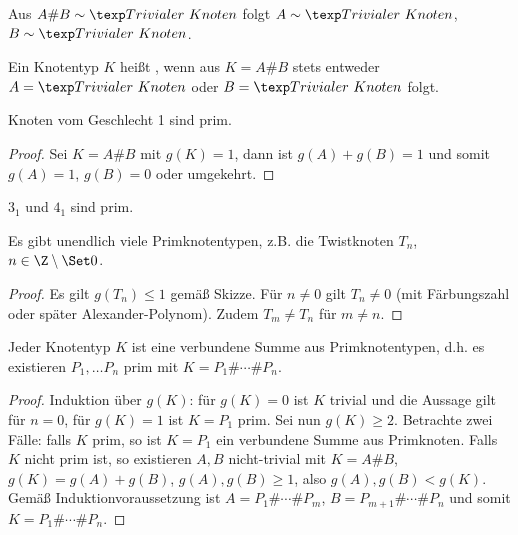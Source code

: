 \begin{kor}
    Aus $A \# B \sim \KnotTriv$ folgt $A \sim \KnotTriv$, $B \sim \KnotTriv$.
\end{kor}

\begin{df}
    Ein Knotentyp $K$ heißt , wenn aus $K = A \# B$ stets entweder $A = \KnotTriv$ oder $B = \KnotTriv$ folgt.
\end{df}

\begin{prop}
    Knoten vom Geschlecht 1 sind prim.
    \begin{proof}
        Sei $K = A \# B$ mit $g(K) = 1$, dann ist $g(A) + g(B) = 1$ und somit $g(A) = 1$, $g(B) = 0$ oder umgekehrt.
    \end{proof}
\end{prop}

\begin{ex}
    $3_1$ und $4_1$ sind prim.
\end{ex}

\begin{prop}
    Es gibt unendlich viele Primknotentypen, z.B. die Twistknoten $T_n$, $n \in \Z \setminus \Set 0$.
    \begin{proof}
        Es gilt $g(T_n) \le 1$ gemäß Skizze.
        Für $n \neq 0$ gilt $T_n \neq 0$ (mit Färbungszahl oder später Alexander-Polynom).
        Zudem $T_m \neq T_n$ für $m \neq n$.
    \end{proof}
\end{prop}

\begin{st}
    Jeder Knotentyp $K$ ist eine verbundene Summe aus Primknotentypen, d.h. es existieren $P_1, \dotsc P_n$ prim mit $K = P_1 \# \dotsb \# P_n$.
    \begin{proof}
        Induktion über $g(K)$: für $g(K) = 0$ ist $K$ trivial und die Aussage gilt für  $n = 0$, für $g(K) = 1$ ist $K = P_1$ prim.
        Sei nun $g(K) \ge 2$.
        Betrachte zwei Fälle: falls $K$ prim, so ist $K = P_1$ ein verbundene Summe aus Primknoten.
        Falls $K$ nicht prim ist, so existieren $A, B$ nicht-trivial mit $K = A \# B$, $g(K) = g(A) + g(B)$, $g(A), g(B) \ge 1$, also $g(A), g(B) < g(K)$.
        Gemäß Induktionvoraussetzung ist $A = P_1 \# \dotsb \# P_m$, $B = P_{m+1} \# \dotsb \# P_n$ und somit $K = P_1 \# \dotsb \# P_n$.
    \end{proof}
\end{st}


